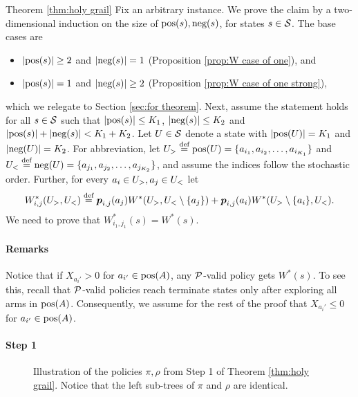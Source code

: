 \begin{proofof}{Theorem \ref{thm:holy grail}}
Fix an arbitrary instance. We prove the claim by a two-dimensional induction on the size of $\textnormal{pos}(s),\textnormal{neg}(s)$, for states $s\in \mathcal{S}$. The base cases are 
\begin{itemize}
\item $\left| \textnormal{pos}(s) \right|\geq 2 $ and $\left| \textnormal{neg}(s) \right| = 1$ (Proposition \ref{prop:W case of one}), and
\item $\left| \textnormal{pos}(s) \right|=1$ and $\left| \textnormal{neg}(s) \right|\geq 2$ (Proposition \ref{prop:W case of one strong}),
\end{itemize}
which we relegate to Section \ref{sec:for theorem}. Next, assume the statement holds for all $s\in \mathcal{S}$ such that $\left| \textnormal{pos}(s) \right|\leq K_1$, $\left| \textnormal{neg}(s) \right|\leq K_2$ and $\left| \textnormal{pos}(s) \right|+\left| \textnormal{neg}(s) \right|< K_1+K_2$. Let $U\in\mathcal{S}$ denote a state with $\left| \textnormal{pos}(U) \right|=K_1$ and $\left| \textnormal{neg}(U) \right|=K_2$. For abbreviation, let $U_>\stackrel{\text{def}}{=}\textnormal{pos}(U)=\{a_{i_1},a_{i_2},\dots ,a_{i_{K_1}}\}$ and $U_<\stackrel{\text{def}}{=}\textnormal{neg}(U)=\{a_{j_1},a_{j_2},\dots ,a_{j_{K_2}}\}$, and assume the indices follow the stochastic order. Further, for every $a_i \in U_>, a_j\in U_<$ let 
\[
W^*_{i,j}(U_>,U_<)\stackrel{\text{def}}{=}\boldsymbol{ p }_{i,j}(a_j)W^*(U_>,U_<\setminus \{a_j\}) +\boldsymbol{ p }_{i,j}(a_i)W^*(U_>\setminus\{a_i\},U_<).
\]
We need to prove that $W^*_{{i_1},{j_1}}(s)=W^*(s)$.
\paragraph{Remarks} Notice that if $X_{a_i'}>0$ for $a_{i'}\in \textnormal{pos}(A)$, any $\mathcal{P}$-valid policy gets $W^*(s)$. To see this, recall that $\mathcal{P}$-valid policies reach terminate states only after exploring all arms in $\textnormal{pos}(A)$. Consequently, we assume for the rest of the proof that $X_{a_i'}\leq 0$ for $a_{i'}\in \textnormal{pos}(A)$. 
\paragraph{Step 1}
\begin{figure}[htbp]
\centering

\caption{Illustration of the policies $\pi,\rho$ from Step 1 of Theorem \ref{thm:holy grail}. Notice that the left sub-trees of $\pi$ and $\rho$ are identical.\label{fig:helping for thm two}
}%
\end{figure}


\end{proofof}
